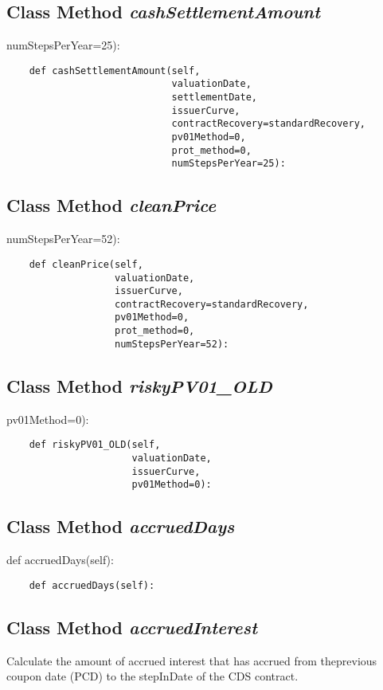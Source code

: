 \documentclass[twoside,11pt]{book}
\begin{document}
\subsection{Class Method {\it cashSettlementAmount}}
numStepsPerYear=25):

\begin{lstlisting}
    def cashSettlementAmount(self,
                             valuationDate,
                             settlementDate,
                             issuerCurve,
                             contractRecovery=standardRecovery,
                             pv01Method=0,
                             prot_method=0,
                             numStepsPerYear=25):
\end{lstlisting}

\subsection{Class Method {\it cleanPrice}}
numStepsPerYear=52):

\begin{lstlisting}
    def cleanPrice(self,
                   valuationDate,
                   issuerCurve,
                   contractRecovery=standardRecovery,
                   pv01Method=0,
                   prot_method=0,
                   numStepsPerYear=52):
\end{lstlisting}

\subsection{Class Method {\it riskyPV01\_OLD}}
pv01Method=0):

\begin{lstlisting}
    def riskyPV01_OLD(self,
                      valuationDate,
                      issuerCurve,
                      pv01Method=0):
\end{lstlisting}

\subsection{Class Method {\it accruedDays}}
def accruedDays(self):

\begin{lstlisting}
    def accruedDays(self):
\end{lstlisting}

\subsection{Class Method {\it accruedInterest}}
Calculate the amount of accrued interest that has accrued from theprevious coupon date (PCD) to the stepInDate of the CDS contract. 
\end{document}
